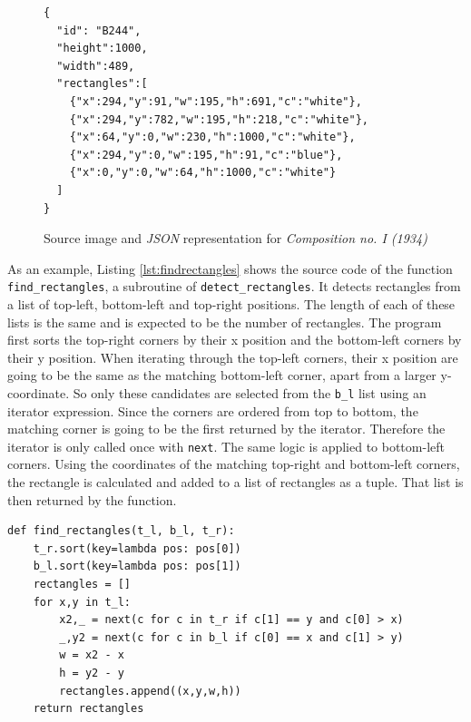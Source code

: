 \documentclass[serif,article,noparskip]{agse-thesis}
\begin{document}
\begin{figure}[b]
\begin{minipage}{0.8\textwidth}
\begin{lstlisting}
{
  "id": "B244",
  "height":1000,
  "width":489,
  "rectangles":[
    {"x":294,"y":91,"w":195,"h":691,"c":"white"},
    {"x":294,"y":782,"w":195,"h":218,"c":"white"},
    {"x":64,"y":0,"w":230,"h":1000,"c":"white"},
    {"x":294,"y":0,"w":195,"h":91,"c":"blue"},
    {"x":0,"y":0,"w":64,"h":1000,"c":"white"}
  ]
}
\end{lstlisting}
\end{minipage}
\caption{Source image and \textit{JSON} representation for \textit{Composition no. I (1934)}}
\label{fig:json}
\end{figure}

As an example, Listing \ref{lst:findrectangles} shows the source code of the
function \texttt{find\_rectangles}, a subroutine of \texttt{detect\_rectangles}.
It detects rectangles from a list of top-left, bottom-left and top-right
positions. The length of each of these lists is the same and is expected to be
the number of rectangles. The program first sorts the top-right corners by their
x position and the bottom-left corners by their y position. When iterating
through the top-left corners, their x position are going to be the same as the
matching bottom-left corner, apart from a larger y-coordinate. So only these
candidates are selected from the \texttt{b\_l} list using an iterator
expression. Since the corners are ordered from top to bottom, the matching corner
is going to be the first returned by the iterator. Therefore the iterator is
only called once with \texttt{next}. The same logic is applied to bottom-left
corners. Using the coordinates of the matching top-right and bottom-left
corners, the rectangle is calculated and added to a list of rectangles as a
tuple. That list is then returned by the function.

\begin{minipage}{\linewidth}
\begin{lstlisting}[otherkeywords=def,label=lst:findrectangles,caption=Function for constructing rectangles from corners]
def find_rectangles(t_l, b_l, t_r):
    t_r.sort(key=lambda pos: pos[0])
    b_l.sort(key=lambda pos: pos[1])
    rectangles = []
    for x,y in t_l:
        x2,_ = next(c for c in t_r if c[1] == y and c[0] > x)
        _,y2 = next(c for c in b_l if c[0] == x and c[1] > y)
        w = x2 - x
        h = y2 - y
        rectangles.append((x,y,w,h))
    return rectangles
\end{lstlisting}
\end{minipage}
\end{document}
